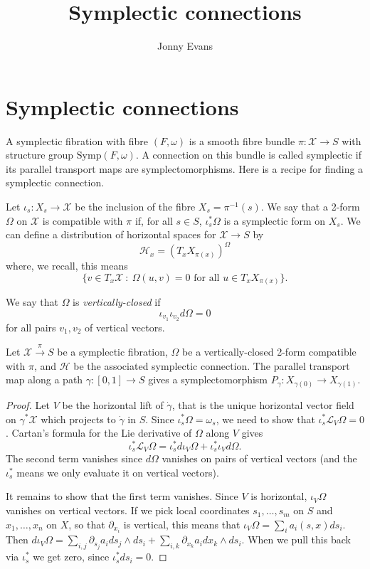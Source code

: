\documentclass{article}
\title{Symplectic connections}
\author{Jonny Evans}
\begin{document}
\section{Symplectic connections}

A symplectic fibration with fibre $(F,\omega)$ is a smooth fibre bundle $\pi\colon\mathcal{X}\to S$ with structure group $\mathrm{Symp}(F,\omega)$. A connection on this bundle is called symplectic if its parallel transport maps are symplectomorphisms. Here is a recipe for finding a symplectic connection.

Let $\iota_s\colon X_s\to \mathcal{X}$ be the inclusion of the fibre $X_s=\pi^{-1}(s)$. We say that a 2-form $\Omega$ on $\mathcal{X}$ is compatible with $\pi$ if, for all $s\in S$, $\iota_s^*\Omega$ is a symplectic form on $X_s$. We can define a distribution of horizontal spaces for $\mathcal{X}\to S$ by
\[\mathcal{H}_x=\left(T_xX_{\pi(x)}\right)^{\Omega}\]
where, we recall, this means
\[\{v\in T_x\mathcal{X}\ :\ \Omega(u,v)=0\mbox{ for all }u\in T_xX_{\pi(x)}\}.\]

\begin{Definition}[dfnsympconn]
  We say that $\Omega$ is {\em vertically-closed} if
  \[\iota_{v_1}\iota_{v_2}d\Omega=0\]
  for all pairs $v_1,v_2$ of vertical vectors. 
\end{Definition}

\begin{Lemma}[lma1]
  Let $\mathcal{X}\stackrel{\pi}{\to}S$ be a symplectic fibration, $\Omega$ be a vertically-closed 2-form compatible with $\pi$, and $\mathcal{H}$ be the associated symplectic connection. The parallel transport map along a path $\gamma\colon[0,1]\to S$ gives a symplectomorphism $P_\gamma\colon X_{\gamma(0)}\to X_{\gamma(1)}$.
\end{Lemma}
\begin{proof}
  Let $V$ be the horizontal lift of $\dot{\gamma}$, that is the unique horizontal vector field on $\gamma^*\mathcal{X}$ which projects to $\dot{\gamma}$ in $S$. Since $\iota_s^*\Omega=\omega_s$, we need to show that $\iota_s^*\mathcal{L}_V\Omega=0$. Cartan's formula for the Lie derivative of $\Omega$ along $V$ gives
  \[\iota_s^*\mathcal{L}_V\Omega=\iota_s^*d\iota_V\Omega+\iota_s^*\iota_Vd\Omega.\]
  The second term vanishes since $d\Omega$ vanishes on pairs of vertical vectors (and the $\iota_s^*$ means we only evaluate it on vertical vectors).

  It remains to show that the first term vanishes. Since $V$ is horizontal, $\iota_V\Omega$ vanishes on vertical vectors. If we pick local coordinates $s_1,\ldots,s_m$ on $S$ and $x_1,\ldots,x_n$ on $X$, so that $\partial_{x_i}$ is vertical, this means that $\iota_V\Omega=\sum_ia_i(s,x)ds_i$. Then $d\iota_V\Omega=\sum_{i,j}\partial_{s_j}a_ids_j\wedge ds_i+\sum_{i,k}\partial_{x_k}a_idx_k\wedge ds_i$. When we pull this back via $\iota_s^*$ we get zero, since $\iota_s^*ds_i=0$.
\end{proof}
\end{document}
